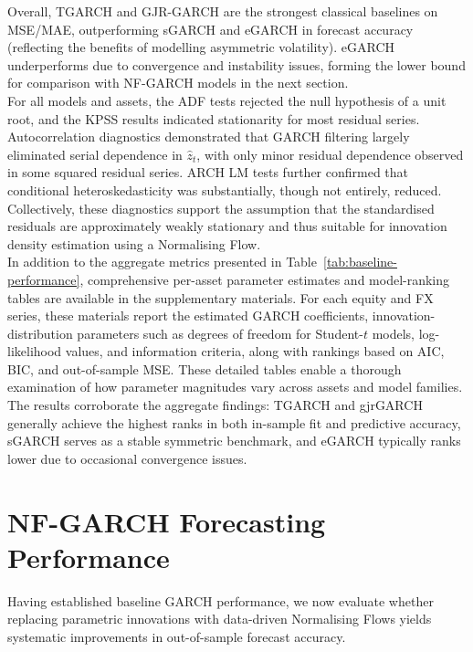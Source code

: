\documentclass[oneside,12pt]{CUEDthesisPSnPDF}
\begin{document}
Overall, TGARCH and GJR-GARCH are the strongest classical baselines on MSE/MAE, outperforming sGARCH and eGARCH in forecast accuracy (reflecting the benefits of modelling asymmetric volatility). eGARCH underperforms due to convergence and instability issues, forming the lower bound for comparison with NF-GARCH models in the next section.\\

For all models and assets, the ADF tests rejected the null hypothesis of a unit root, and the KPSS results indicated stationarity for most residual series. Autocorrelation diagnostics demonstrated that GARCH filtering largely eliminated serial dependence in $\hat{z}_t$, with only minor residual dependence observed in some squared residual series. ARCH LM tests further confirmed that conditional heteroskedasticity was substantially, though not entirely, reduced. Collectively, these diagnostics support the assumption that the standardised residuals are approximately weakly stationary and thus suitable for innovation density estimation using a Normalising Flow. \\

In addition to the aggregate metrics presented in Table~\ref{tab:baseline-performance}, comprehensive per-asset parameter estimates and model-ranking tables are available in the supplementary materials. For each equity and FX series, these materials report the estimated GARCH coefficients, innovation-distribution parameters such as degrees of freedom for Student-$t$ models, log-likelihood values, and information criteria, along with rankings based on AIC, BIC, and out-of-sample MSE. These detailed tables enable a thorough examination of how parameter magnitudes vary across assets and model families. The results corroborate the aggregate findings: TGARCH and gjrGARCH generally achieve the highest ranks in both in-sample fit and predictive accuracy, sGARCH serves as a stable symmetric benchmark, and eGARCH typically ranks lower due to occasional convergence issues.\\


\section{NF-GARCH Forecasting Performance}
\label{sec:nf_forecast_results}
\noindent
Having established baseline GARCH performance, we now evaluate whether replacing parametric innovations with data-driven Normalising Flows yields systematic improvements in out-of-sample forecast accuracy.\\
\end{document}
